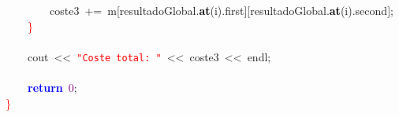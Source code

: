 \mbox{}\ \ \ \ \ \ \ \ coste3\ \textcolor{BrickRed}{+=}\ m\textcolor{BrickRed}{[}resultadoGlobal\textcolor{BrickRed}{.}\textbf{\textcolor{Black}{at}}\textcolor{BrickRed}{(}i\textcolor{BrickRed}{).}first\textcolor{BrickRed}{][}resultadoGlobal\textcolor{BrickRed}{.}\textbf{\textcolor{Black}{at}}\textcolor{BrickRed}{(}i\textcolor{BrickRed}{).}second\textcolor{BrickRed}{];}\  \\
\mbox{}\ \ \ \ \textcolor{Red}{\}} \\
\mbox{}\ \ \ \  \\
\mbox{}\ \ \ \ cout\ \textcolor{BrickRed}{\textless{}\textless{}}\ \texttt{\textcolor{Red}{"{}Coste\ total:\ "{}}}\ \textcolor{BrickRed}{\textless{}\textless{}}\ coste3\ \textcolor{BrickRed}{\textless{}\textless{}}\ endl\textcolor{BrickRed}{;}\ \ \ \ \ \ \ \ \ \ \ \ \  \\
\mbox{} \\
\mbox{}\ \ \ \ \textbf{\textcolor{Blue}{return}}\ \textcolor{Purple}{0}\textcolor{BrickRed}{;}\  \\
\mbox{}\textcolor{Red}{\}}
